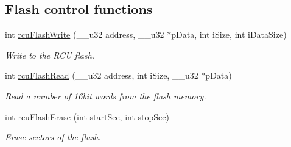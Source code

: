 \subsection*{Flash control functions}
\begin{CompactItemize}
\item 
int \hyperlink{group__dcsc__msg__buffer__access_g88debbd24075d2031add9459e4d90e2b}{rcu\-Flash\-Write} (\_\-\_\-u32 address, \_\-\_\-u32 $\ast$p\-Data, int i\-Size, int i\-Data\-Size)
\begin{CompactList}\small\item\em Write to the RCU flash. \item\end{CompactList}\item 
int \hyperlink{group__dcsc__msg__buffer__access_g24164f14711ead31a7e542711f0a08b3}{rcu\-Flash\-Read} (\_\-\_\-u32 address, int i\-Size, \_\-\_\-u32 $\ast$p\-Data)
\begin{CompactList}\small\item\em Read a number of 16bit words from the flash memory. \item\end{CompactList}\item 
int \hyperlink{group__dcsc__msg__buffer__access_g78e6fc883a098cf548e9d0ba618ecb16}{rcu\-Flash\-Erase} (int start\-Sec, int stop\-Sec)
\begin{CompactList}\small\item\em Erase sectors of the flash. \item\end{CompactList}\end{CompactItemize}
